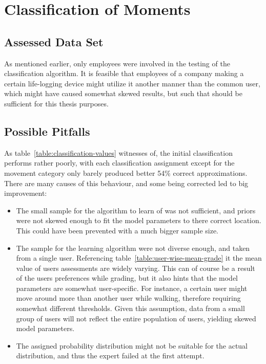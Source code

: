 \section{Classification of Moments}

\subsection{Assessed Data Set}
As mentioned earlier, only employees were involved in the testing of the 
classification algorithm. It is feasible that employees of a company making
a certain life-logging device might utilize it another manner than the common 
user, which might have caused somewhat skewed results, but such that should
be sufficient for this thesis purposes.

\subsection{Possible Pitfalls}
As table~\ref{table:classification-values} witnesses of, the initial 
classification performs 
rather poorly, with each classification assignment except for the 
movement category only barely produced better 54\% correct 
approximations. There are many causes of this behaviour, and some 
being corrected led to  big improvement:

\begin{itemize}
\item The small sample for the algorithm to learn of was not sufficient, 
    and priors were not skewed enough to fit the model parameters to
    there correct location. This could have been prevented with a much
    bigger sample size. 
\item The sample for the learning algorithm were not diverse enough, and
    taken from a single user. Referencing 
    table~\ref{table:user-wise-mean-grade} it the mean value of users 
    assessments are widely varying. This can of course be a result of the
    users preferences while grading, but it also hints that the model 
    parameters are somewhat user-specific. For instance, a certain user 
    might move around more than another user while walking, therefore
    requiring somewhat different thresholds. Given this assumption, data
    from a small group of users will not reflect the entire population 
    of users, yielding skewed model parameters. 
\item The assigned probability distribution might not be suitable for the
    actual distribution, and thus the expert failed at the first attempt.
\end{itemize}

